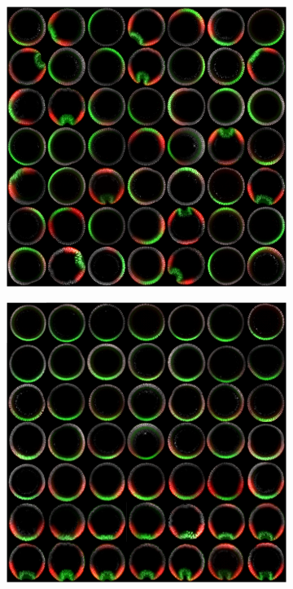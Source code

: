 \documentclass[11pt]{article}
\begin{document}
\begin{figure}
\begin{subfigure}{0.5\textwidth}
\includegraphics[width=\textwidth]{fig2a}
\caption{}
\end{subfigure}
\begin{subfigure}{0.5\textwidth}
\includegraphics[width=\textwidth]{fig2b}
\caption{}
\end{subfigure}
\caption{}
\end{figure}
\end{document}

